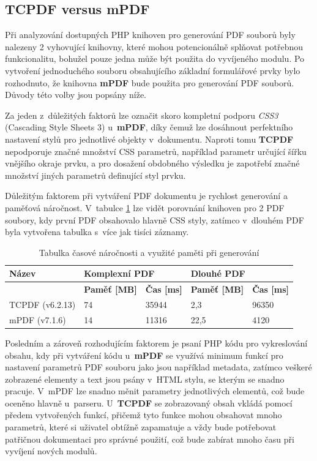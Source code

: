 \subsection{TCPDF versus mPDF}
Při analyzování dostupných PHP knihoven pro generování PDF souborů byly nalezeny 2 vyhovující knihovny, které mohou potencionálně splňovat potřebnou funkcionalitu, bohužel pouze jedna může být použita do vyvíjeného modulu. Po vytvoření jednoduchého souboru obsahujícího základní formulářové prvky bylo rozhodnuto, že knihovna \textbf{mPDF} bude použita pro generování PDF souborů. Důvody této volby jsou popsány níže.
\par
Za jeden z~důležitých faktorů lze označit skoro kompletní podporu \textit{CSS3} (Cascading Style Sheets 3) u~\textbf{mPDF}, díky čemuž lze dosáhnout perfektního nastavení stylů pro jednotlivé objekty v~dokumentu. Naproti tomu \textbf{TCPDF} nepodporuje značné množství CSS parametrů, například parametr určující šířku vnějšího okraje prvku, a pro dosažení obdobného výsledku je zapotřebí značné množství jiných parametrů definující styl prvku.
\par
Důležitým faktorem při vytváření PDF dokumentu je rychlost generování a paměťová náročnost. V~tabulce \ref{tab:table_generators} lze vidět porovnání knihoven pro 2  PDF soubory, kdy první PDF obsahovalo hlavně CSS styly, zatímco v~dlouhém PDF byla vytvořena tabulka s~více jak tisíci záznamy.
\begin{table}[h!]
\centering
\begin{tabular}{|l|l|l|l|l|} 
\hline
\textbf{Název} & \multicolumn{2}{l|}{\textbf{Komplexní PDF}} & \multicolumn{2}{l|}{\textbf{Dlouhé PDF}}  \\ 
\hline
               & \textbf{Paměť [MB]} & \textbf{Čas [ms]}     & \textbf{Paměť [MB]} & \textbf{Čas [ms]}   \\ 
\hline
TCPDF (v6.2.13)          & 74                  & 35944                 & 2,3                 & 96350               \\ 
\hline
mPDF   (v7.1.6)           & 14                  & 11316                 & 22,5                & 4120                \\
\hline
\end{tabular}
\caption{Tabulka časové náročnosti a využité paměti při generování}
\label{tab:table_generators}
\end{table}
\par
Posledním a zároveň rozhodujícím faktorem je psaní PHP kódu pro vykreslování obsahu, kdy při vytváření kódu u~\textbf{mPDF} se využívá minimum funkcí pro nastavení parametrů PDF souboru jako jsou například metadata, zatímco veškeré zobrazené elementy a text jsou psány v~HTML stylu, se kterým se snadno pracuje. V~mPDF lze snadno měnit parametry jednotlivých elementů, což bude oceněno hlavně u~parseru. U~\textbf{TCPDF} se zobrazovaný obsah vkládá pomocí předem vytvořených funkcí, přičemž tyto funkce mohou obsahovat mnoho parametrů, které si uživatel obtížně zapamatuje a vždy bude potřebovat patřičnou dokumentaci pro správné použití, což bude zabírat mnoho času při vyvíjení nových modulů.

